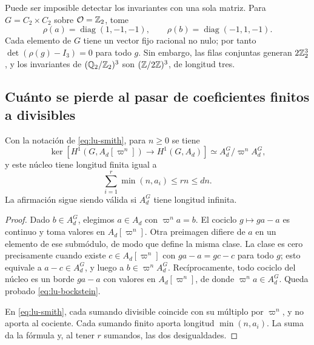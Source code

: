 Puede ser imposible detectar los invariantes con una sola matriz.
Para $G=C_2\times C_2$ sobre $\mathcal O=\mathbb{Z}_2$, tome
\begin{equation}
 \rho(a)=\operatorname{diag}(1,-1,-1),\qquad
 \rho(b)=\operatorname{diag}(-1,1,-1).
 \label{eq:lu-klein}
\end{equation}
Cada elemento de $G$ tiene un vector fijo racional no nulo;
por tanto $\det(\rho(g)-I_3)=0$ para todo $g$. Sin embargo, las
filas conjuntas generan $2\mathbb{Z}_2^3$, y los invariantes de
$(\mathbb{Q}_2/\mathbb{Z}_2)^3$ son $(\mathbb{Z}/2\mathbb{Z})^3$, de longitud tres.

\subsection{Cuánto se pierde al pasar de coeficientes finitos a divisibles}
\label{subsec:lu-bockstein}

\begin{proposicion}
\label{prop:lu-bockstein}
Con la notación de \eqref{eq:lu-smith}, para $n\ge0$ se tiene
\begin{equation}
 \ker\!\left[H^1(G,A_d[\varpi^n])\to H^1(G,A_d)\right]
       \simeq A_d^G/\varpi^n A_d^G,
 \label{eq:lu-bockstein}
\end{equation}
y este núcleo tiene longitud finita igual a
\begin{equation}
 \sum_{i=1}^r\min(n,a_i)\le rn\le dn.
 \label{eq:lu-bockstein-longitud}
\end{equation}
La afirmación sigue siendo válida si $A_d^G$ tiene longitud infinita.
\end{proposicion}
\begin{proof}
Dado $b\in A_d^G$, elegimos $a\in A_d$ con $\varpi^n a=b$.
El cociclo $g\mapsto ga-a$ es continuo y toma valores en
$A_d[\varpi^n]$. Otra preimagen difiere de $a$ en un elemento
de ese submódulo, de modo que define la misma clase.
La clase es cero precisamente cuando existe
$c\in A_d[\varpi^n]$ con $ga-a=gc-c$ para todo $g$; esto
equivale a $a-c\in A_d^G$, y luego a
$b\in\varpi^n A_d^G$. Recíprocamente, todo cociclo del núcleo
es un borde $ga-a$ con valores en $A_d[\varpi^n]$, de donde
$\varpi^n a\in A_d^G$. Queda probado \eqref{eq:lu-bockstein}.

En \eqref{eq:lu-smith}, cada sumando divisible coincide con su
múltiplo por $\varpi^n$, y no aporta al cociente. Cada sumando
finito aporta longitud $\min(n,a_i)$. La suma da la fórmula
y, al tener $r$ sumandos, las dos desigualdades.
\end{proof}


